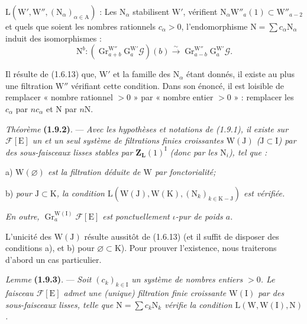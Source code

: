\documentclass[11pt,leqno]{article}
\begin{document}
\(\mathrm{L}(\mathrm{W}',\mathrm{W}'',(\mathrm{N}_\alpha)_{\alpha\in\mathrm{A}})\) : Les \(\mathrm{N}_\alpha\) stabilisent \(\mathrm{W}'\), vérifient \(\mathrm{N}_\alpha\mathrm{W}''_a(1)\subset\mathrm{W}''_{a-2}\) et quels que soient les nombres rationnels \(c_\alpha>0\), l’endomorphisme \(\mathrm{N}=\sum c_\alpha\mathrm{N}_\alpha\) induit des isomorphismes :
\[
\mathrm{N}^b:
(\operatorname{Gr}_{a+b}^{\mathrm{W}''}\mathrm{G}_a^{\mathrm{W}'}\mathscr{G})(b)
\xrightarrow{\sim}
\operatorname{Gr}_{a-b}^{\mathrm{W}''}\mathrm{G}_a^{\mathrm{W}'}\mathscr{G}.
\]

Il résulte de (1.6.13) que, \(\mathrm{W}'\) et la famille des \(\mathrm{N}_\alpha\) étant donnés, il existe au plus une filtration \(\mathrm{W}''\) vérifiant cette condition. Dans son énoncé, il est loisible de remplacer « nombre rationnel \(>0\) » par « nombre entier \(>0\) » : remplacer les \(c_\alpha\) par \(nc_\alpha\) et \(\mathrm{N}\) par \(n\mathrm{N}\).

\textit{Théorème} \textbf{(1.9.2)}. — \textit{Avec les hypothèses et notations de \textup{(1.9.1)}, il existe sur \(\mathscr{F}[\mathrm{E}]\) un et un seul système de filtrations finies croissantes \(\mathrm{W}(\mathrm{J})\) (\(\mathrm{J}\subset\mathrm{I}\)) par des sous-faisceaux lisses stables par \(\mathbf{Z}_{\mathbf{L}}(1)^{\mathrm{I}}\) (donc par les \(\mathrm{N}_i\)), tel que :}

\noindent a) \textit{\(\mathrm{W}(\varnothing)\) est la filtration déduite de \(\mathrm{W}\) par fonctorialité;}

\noindent b) \textit{pour \(\mathrm{J}\subset\mathrm{K}\), la condition \(\mathrm{L}(\mathrm{W}(\mathrm{J}),\mathrm{W}(\mathrm{K}),(\mathrm{N}_k)_{k\in\mathrm{K}-\mathrm{J}})\) est vérifiée.}

\noindent\textit{En outre, \(\operatorname{Gr}_a^{\mathrm{W}(\mathrm{I})}\mathscr{F}[\mathrm{E}]\) est ponctuellement \(\iota\)-pur de poids \(a\).}

L’unicité des \(\mathrm{W}(\mathrm{J})\) résulte aussitôt de (1.6.13) (et il suffit de disposer des conditions a), et b) pour \(\varnothing\subset\mathrm{K}\)). Pour prouver l’existence, nous traiterons d’abord un cas particulier.

\textit{Lemme} \textbf{(1.9.3)}. — \textit{Soit \((c_k)_{k\in\mathrm{I}}\) un système de nombres entiers \(>0\). Le faisceau \(\mathscr{F}[\mathrm{E}]\) admet une (unique) filtration finie croissante \(\mathrm{W}(\mathrm{I})\) par des sous-faisceaux lisses, telle que \(\mathrm{N}=\sum c_k\mathrm{N}_k\) vérifie la condition \(\mathrm{L}(\mathrm{W},\mathrm{W}(\mathrm{I}),\mathrm{N})\).}
\end{document}
